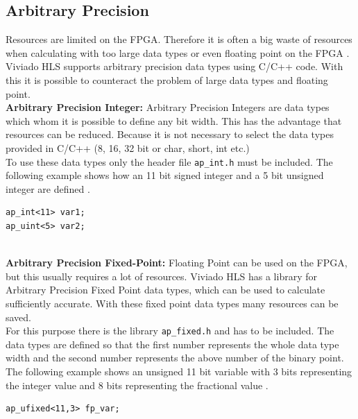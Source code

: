 \newpage
\subsection{Arbitrary Precision} \label{ch:ap}
Resources are limited on the FPGA. Therefore it is often a big waste of resources when calculating with too large data types or even floating point on the FPGA \cite{floating}. Viviado HLS supports arbitrary precision data types using C/C++ code. With this it is possible to counteract the problem of large data types and floating point. \\

\textbf{Arbitrary Precision Integer:}
Arbitrary Precision Integers are data types which whom it is possible to define
any bit width. This has the advantage that resources can be reduced. Because it is not necessary to select the data types provided in C/C++ (8, 16, 32 bit or char, short, int etc.) \\
To use these data types only the header file \texttt{ap\_int.h} must be
included. The following example shows how an 11 bit signed integer and a 5 bit unsigned integer are defined \cite{ug902}.

\begin{minipage}{\textwidth}
\begin{lstlisting}[style=CStyle]
ap_int<11> var1;
ap_uint<5> var2;
\end{lstlisting}
\end{minipage} \\

\textbf{Arbitrary Precision Fixed-Point:}
Floating Point can be used on the FPGA, but this usually requires a lot of resources. Viviado HLS has a library for Arbitrary Precision Fixed Point data types, which can be used to calculate sufficiently accurate. With these fixed point data types many resources can be saved. \\
For this purpose there is the library \texttt{ap\_fixed.h} and has to be
included. The data types are defined so that the first number represents the whole data type width and the second number represents the above number of the binary point. The following example shows an unsigned 11 bit variable with 3 bits representing the integer value and 8 bits representing the fractional value \cite{ug902}.

\begin{minipage}{\textwidth}
\begin{lstlisting}[style=CStyle]
ap_ufixed<11,3> fp_var;
\end{lstlisting}
\end{minipage}

